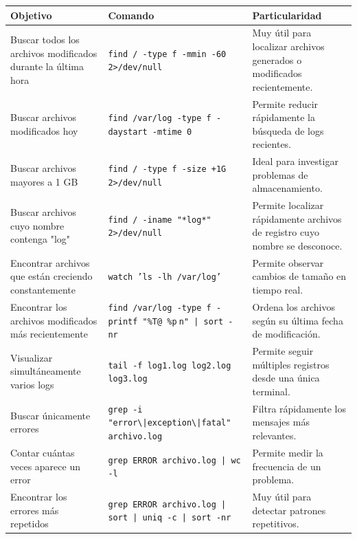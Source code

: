 \documentclass[a4paper,10pt]{article}
\begin{document}
\begin{longtable}{|p{4.8cm}|p{7.5cm}|p{4cm}|}

\hline
Objetivo &
Comando &
Particularidad
\\
\hline
\endhead

Buscar todos los archivos modificados durante la última hora &
\texttt{find / -type f -mmin -60 2>/dev/null} &
Muy útil para localizar archivos generados o modificados recientemente.
\\
\hline

Buscar archivos modificados hoy &
\texttt{find /var/log -type f -daystart -mtime 0} &
Permite reducir rápidamente la búsqueda de logs recientes.
\\
\hline

Buscar archivos mayores a 1 GB &
\texttt{find / -type f -size +1G 2>/dev/null} &
Ideal para investigar problemas de almacenamiento.
\\
\hline

Buscar archivos cuyo nombre contenga "log" &
\texttt{find / -iname "*log*" 2>/dev/null} &
Permite localizar rápidamente archivos de registro cuyo nombre se desconoce.
\\
\hline

Encontrar archivos que están creciendo constantemente &
\texttt{watch 'ls -lh /var/log'} &
Permite observar cambios de tamaño en tiempo real.
\\
\hline

Encontrar los archivos modificados más recientemente &
\texttt{find /var/log -type f -printf "\%T@ \%p$ \ $n" | sort -nr} &
Ordena los archivos según su última fecha de modificación.
\\
\hline

Visualizar simultáneamente varios logs &
\texttt{tail -f log1.log log2.log log3.log} &
Permite seguir múltiples registros desde una única terminal.
\\
\hline

Buscar únicamente errores &
\texttt{grep -i "error\textbackslash|exception\textbackslash|fatal" archivo.log} &
Filtra rápidamente los mensajes más relevantes.
\\
\hline

Contar cuántas veces aparece un error &
\texttt{grep ERROR archivo.log | wc -l} &
Permite medir la frecuencia de un problema.
\\
\hline

Encontrar los errores más repetidos &
\texttt{grep ERROR archivo.log | sort | uniq -c | sort -nr} &
Muy útil para detectar patrones repetitivos.
\\
\hline


\end{longtable}
\end{document}
